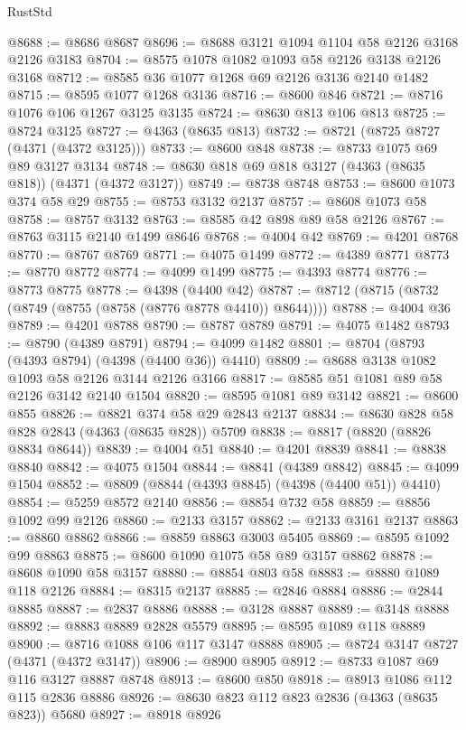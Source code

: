 \begin{lexlean}{RustStd}
\begin{coremodule}
{\begin{coremodule}
{{{{{{{{{{{{{{{{@8688 := @8686 @8687
@8696 := @8688 @3121 @1094 @1104 @58 @2126 @3168 @2126 @3183
@8704 := @8575 @1078 @1082 @1093 @58 @2126 @3138 @2126 @3168
@8712 := @8585 @36 @1077 @1268 @69 @2126 @3136 @2140 @1482
@8715 := @8595 @1077 @1268 @3136
@8716 := @8600 @846
@8721 := @8716 @1076 @106 @1267 @3125 @3135
@8724 := @8630 @813 @106 @813
@8725 := @8724 @3125
@8727 := @4363 (@8635 @813)
@8732 := @8721 (@8725 @8727 (@4371 (@4372 @3125)))
@8733 := @8600 @848
@8738 := @8733 @1075 @69 @89 @3127 @3134
@8748 := @8630 @818 @69 @818 @3127 (@4363 (@8635 @818)) (@4371 (@4372 @3127))
@8749 := @8738 @8748
@8753 := @8600 @1073 @374 @58 @29
@8755 := @8753 @3132 @2137
@8757 := @8608 @1073 @58
@8758 := @8757 @3132
@8763 := @8585 @42 @898 @89 @58 @2126
@8767 := @8763 @3115 @2140 @1499 @8646
@8768 := @4004 @42
@8769 := @4201 @8768
@8770 := @8767 @8769
@8771 := @4075 @1499
@8772 := @4389 @8771
@8773 := @8770 @8772
@8774 := @4099 @1499
@8775 := @4393 @8774
@8776 := @8773 @8775
@8778 := @4398 (@4400 @42)
@8787 := @8712 (@8715 (@8732 (@8749 (@8755 (@8758 (@8776 @8778 @4410)) @8644))))
@8788 := @4004 @36
@8789 := @4201 @8788
@8790 := @8787 @8789
@8791 := @4075 @1482
@8793 := @8790 (@4389 @8791)
@8794 := @4099 @1482
@8801 := @8704 (@8793 (@4393 @8794) (@4398 (@4400 @36)) @4410)
@8809 := @8688 @3138 @1082 @1093 @58 @2126 @3144 @2126 @3166
@8817 := @8585 @51 @1081 @89 @58 @2126 @3142 @2140 @1504
@8820 := @8595 @1081 @89 @3142
@8821 := @8600 @855
@8826 := @8821 @374 @58 @29 @2843 @2137
@8834 := @8630 @828 @58 @828 @2843 (@4363 (@8635 @828)) @5709
@8838 := @8817 (@8820 (@8826 @8834 @8644))
@8839 := @4004 @51
@8840 := @4201 @8839
@8841 := @8838 @8840
@8842 := @4075 @1504
@8844 := @8841 (@4389 @8842)
@8845 := @4099 @1504
@8852 := @8809 (@8844 (@4393 @8845) (@4398 (@4400 @51)) @4410)
@8854 := @5259 @8572 @2140
@8856 := @8854 @732 @58
@8859 := @8856 @1092 @99 @2126
@8860 := @2133 @3157
@8862 := @2133 @3161 @2137
@8863 := @8860 @8862
@8866 := @8859 @8863 @3003 @5405
@8869 := @8595 @1092 @99 @8863
@8875 := @8600 @1090 @1075 @58 @89 @3157 @8862
@8878 := @8608 @1090 @58 @3157
@8880 := @8854 @803 @58
@8883 := @8880 @1089 @118 @2126
@8884 := @8315 @2137
@8885 := @2846 @8884
@8886 := @2844 @8885
@8887 := @2837 @8886
@8888 := @3128 @8887
@8889 := @3148 @8888
@8892 := @8883 @8889 @2828 @5579
@8895 := @8595 @1089 @118 @8889
@8900 := @8716 @1088 @106 @117 @3147 @8888
@8905 := @8724 @3147 @8727 (@4371 (@4372 @3147))
@8906 := @8900 @8905
@8912 := @8733 @1087 @69 @116 @3127 @8887 @8748
@8913 := @8600 @850
@8918 := @8913 @1086 @112 @115 @2836 @8886
@8926 := @8630 @823 @112 @823 @2836 (@4363 (@8635 @823)) @5680
@8927 := @8918 @8926
}}}}}}}}}}}}}}}}
\end{coremodule}}
\end{coremodule}
\end{lexlean}
